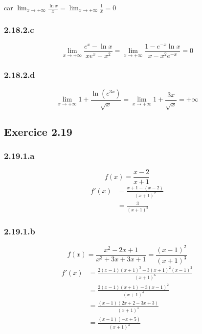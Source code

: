 \documentclass[a4paper,10pt]{report}
\begin{document}
car $\lim_{x \rightarrow +\infty} \frac{\ln x}{x} = \lim_{x \rightarrow +\infty} \frac{1}{x} = 0$

\subsubsection*{2.18.2.c}
\begin{displaymath}
	\lim_{x \rightarrow +\infty} \frac{e^x - \ln x}{xe^x-x^2} = \lim_{x \rightarrow +\infty} \frac{1 - e^{-x}\ln x}{x-x^2e^{-x}} = 0
\end{displaymath}

\subsubsection*{2.18.2.d}
\begin{displaymath}
	\lim_{x \rightarrow +\infty} 1+ \frac{\ln (e^{3x})}{\sqrt{x}} = \lim_{x \rightarrow +\infty} 1+ \frac{3x}{\sqrt{x}} = +\infty
\end{displaymath}


\subsection*{Exercice 2.19}
\subsubsection*{2.19.1.a}
\begin{displaymath}
	f(x) = \frac{x-2}{x+1}
\end{displaymath}
\begin{equation*}
	\begin{split}
		f'(x) &=\frac{x+1 - (x-2)}{(x+1)^2}\\
		      &=\frac{3}{(x+1)^2}
	\end{split}	
\end{equation*}

\subsubsection*{2.19.1.b}
\begin{displaymath}
	f(x) = \frac{x^2-2x+1}{x^3+3x+3x+1} = \frac{(x-1)^2}{(x+1)^3}
\end{displaymath}
\begin{equation*}
	\begin{split}
		f'(x) &=\frac{2(x-1)(x+1)^3 - 3(x+1)^2(x-1)^2}{(x+1)^6}\\
		      &=\frac{2(x-1)(x+1) - 3(x-1)^2}{(x+1)^4} \\
		      &=\frac{(x-1)(2x+2-3x+3)}{(x+1)^4} \\
		      &=\frac{(x-1)(-x+5)}{(x+1)^4}
	\end{split}	
\end{equation*}
\end{document}
